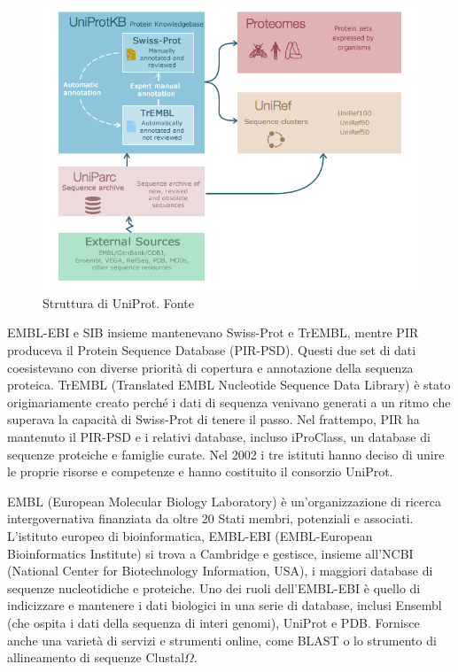 \begin{figure}[!htb]
	\centering
	\includegraphics[scale=0.5]{images/uniprot.png}
	\caption{Struttura di UniProt. Fonte\cite{uniProt}}
	\label{fig:uniprot}
\end{figure}

EMBL-EBI e SIB insieme mantenevano Swiss-Prot e TrEMBL, mentre PIR produceva il Protein Sequence Database (PIR-PSD). Questi due set di dati coesistevano con diverse priorità di copertura e annotazione della sequenza proteica.  TrEMBL (Translated EMBL Nucleotide Sequence Data Library) è stato originariamente creato perché i dati di sequenza venivano generati a un ritmo che superava la capacità di Swiss-Prot di tenere il passo.  Nel frattempo, PIR ha mantenuto il PIR-PSD e i relativi database, incluso iProClass, un database di sequenze proteiche e famiglie curate.  Nel 2002 i tre istituti hanno deciso di unire le proprie risorse e competenze e hanno costituito il consorzio UniProt.\\

\par EMBL (European Molecular Biology Laboratory) è un'organizzazione di ricerca intergovernativa finanziata da oltre 20 Stati membri, potenziali e associati. L'istituto europeo di bioinformatica, EMBL-EBI (EMBL-European Bioinformatics Institute) si trova a Cambridge e gestisce, insieme all'NCBI (National Center for Biotechnology Information, USA), i maggiori database di sequenze nucleotidiche e proteiche. Uno dei ruoli dell'EMBL-EBI è quello di indicizzare e mantenere i dati biologici in una serie di database, inclusi Ensembl (che ospita i dati della sequenza di interi genomi), UniProt e PDB. Fornisce anche una varietà di servizi e strumenti online, come BLAST o lo strumento di allineamento di sequenze Clustal$\Omega$.\\


